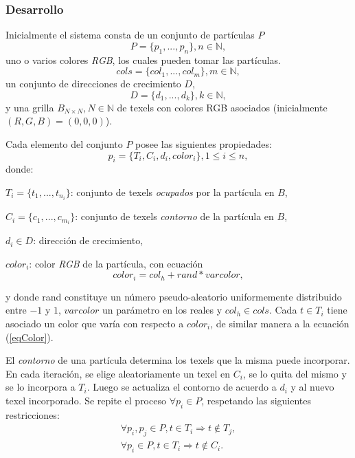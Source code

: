 \subsubsection{Desarrollo}
Inicialmente el sistema consta de un conjunto de part\'iculas $P$
\begin{equation}
P = \{p_{1}, ... , p_{n}\}, n  \in \mathbb{N},
\end{equation}
uno o varios colores {\em RGB}, los cuales pueden tomar las part\'iculas.
\begin{equation}
cols = \{col_{1}, ... , col_{m} \}, m \in \mathbb{N},
\end{equation}
un conjunto de direcciones de crecimiento $D$,
\begin{equation}
D = \{d_{1}, ... , d_{k} \}, k \in \mathbb{N},
\end{equation}
y una grilla $B_{N\times N}, N \in \mathbb{N} $ de texels con colores RGB asociados (inicialmente $(R,G,B)=(0,0,0)$).

Cada elemento del conjunto $P$ posee las siguientes propiedades:
\begin{equation}
p_{i} = \{T_{i}, C_{i}, d_{i}, color_{i}\}, 1 \le i \le n,
\end{equation}
donde:

$T_{i} = \{t_{1}, ... , t_{n_{i}}\}$: conjunto de texels {\em ocupados} por la part\'icula en $B$,

$C_{i} = \{c_{1}, ... , c_{m_{i}}\}$: conjunto de texels {\em contorno} de la part\'icula en $B$,

$d_{i} \in D$: direcci\'on de crecimiento,

$color_{i}$: color {\em RGB} de la part\'icula, con ecuaci\'on \cite{Reeves1983}
\begin{equation}
color_{i} = col_{h} + rand * varcolor,
\label{eqColor}
\end{equation}

\noindent
y donde rand constituye un n\'umero pseudo-aleatorio uniformemente distribuido entre $-1$ y $1$, $varcolor$ un parámetro en los reales y $col_{h} \in cols$.
Cada $t \in T_{i}$ tiene asociado un color que var\'ia con respecto a $color_{i}$, de similar manera a la ecuaci\'on (\ref{eqColor}).

El {\em contorno} de una part\'icula determina los texels que la misma puede incorporar. 
En cada iteraci\'on, se elige aleatoriamente un texel en $C_{i}$, se lo quita del mismo y se lo incorpora a $T_{i}$.
Luego se actualiza el contorno de acuerdo a $d_{i}$ y al nuevo texel incorporado.
Se repite el proceso $\forall p_{i} \in P$, respetando las siguientes restricciones:
\begin{eqnarray}
\forall p_{i}, p_{j} \in P, t \in T_{i} \Rightarrow t \notin T_{j}, \\
\forall p_{i} \in P, t \in T_{i} \Rightarrow t \notin C_{i}.
\end{eqnarray}

